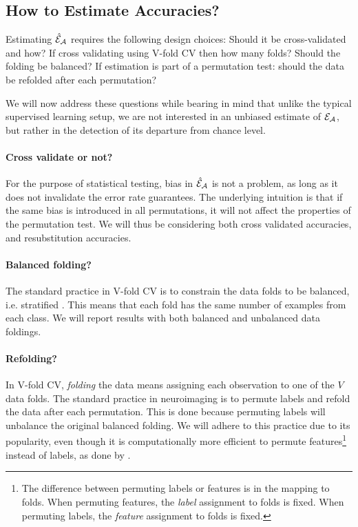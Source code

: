 \documentclass[journal]{IEEEtran}
\begin{document}
\subsection{How to Estimate Accuracies?}
\label{sec:considerations}

Estimating $\hat{\mathcal{E}}_{\mathcal{A}}$ requires the following design choices: 
Should it be cross-validated and how? 
If cross validating using V-fold CV then how many folds? 
Should the folding be balanced?
If estimation is part of a permutation test: should the data be refolded after each permutation? 

We will now address these questions while bearing in mind that unlike the typical supervised learning setup, we are not interested in an unbiased estimate of $\mathcal{E}_{\mathcal{A}}$, but rather in the detection of its departure from chance level. 

\paragraph{Cross validate or not?}
For the purpose of statistical testing, bias in $\hat{\mathcal{E}}_{\mathcal{A}}$ is not a problem, as long as it does not invalidate the error rate guarantees. 
The underlying intuition is that if the same bias is introduced in all permutations, it will not affect the properties of the permutation test. 
We will thus be considering both cross validated accuracies, and resubstitution accuracies.


\paragraph{Balanced folding?}
The standard practice in V-fold CV is to constrain the data folds to be balanced, i.e. stratified \cite{ojala_permutation_2010}.
This means that each fold has the same number of examples from each class. 
We will report results with both balanced and unbalanced data foldings. 


\paragraph{Refolding?}
In V-fold CV, \emph{folding} the data means assigning each observation to one of the $V$ data folds. 
The standard practice in neuroimaging is to permute labels and refold the data after each permutation. 
This is done because permuting labels will unbalance the original balanced folding.
We will adhere to this practice due to its popularity, even though it is computationally more efficient to permute features\footnote{The difference between permuting labels or features is in the mapping to folds. When permuting features, the \textit{label} assignment to folds is fixed. When permuting labels, the \textit{feature} assignment to folds is fixed.} instead of labels, as done by \cite{golland_permutation_2005}.
\end{document}
